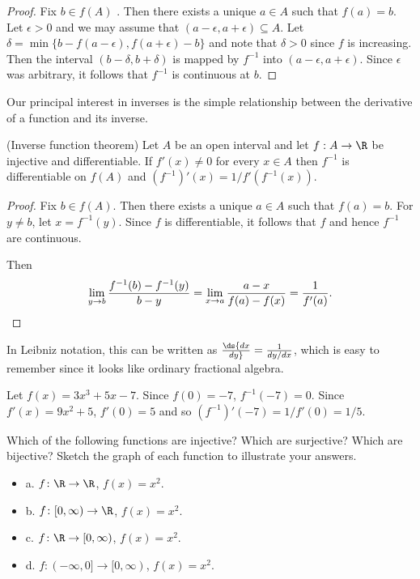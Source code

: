\begin{theorem}
\begin{theorem}
\begin{theorem}
\begin{theorem}
\begin{proof}
Fix $b\in f(A)$ . Then there exists a unique $a\in A$ such that
$f(a) = b $. Let $\epsilon > 0 $ and we may assume that $(a-\epsilon
, a+\epsilon ) \subseteq A $. Let $\delta =\min \{ b-
f(a-\epsilon ) , f(a+\epsilon ) -b \}$ and note that
$\delta
>0 $ since $f$ is increasing.  Then the interval $(b-\delta ,
b+\delta ) $ is mapped by $f^{-1} $ into $(a-\epsilon , a+\epsilon )
$. Since $\epsilon $ was arbitrary, it follows that $f^{-1 }$ is
continuous at $b$.
\end{proof}

Our principal interest in inverses is the simple relationship between
the derivative of a function and its inverse.

\begin{theorem} (Inverse function theorem) Let $A$ be an open interval and let $f:A\to
\label{thm:inverse function theorem}
\R$ be injective and differentiable.   If $f'(x) \neq 0 $
for every $x\in A $ then $f^{-1}$ is differentiable on $f(A)$ and
$(f^{-1})'(x) = 1/f'(f^{-1}(x))$.

\begin{proof} Fix $b\in f(A)$. Then there exists a unique $a\in A$ such
that $f(a)=b$. For $y\neq b $, let $x=f^{-1} (y) $. Since $f$ is
differentiable, it follows that $f$ and hence $f^{-1}$ are
continuous.

Then
$$\lim_{y\to b}{f^{-1} (b) - f^{-1} (y)\over b-y}
   = \lim_{x\to a}{a-x\over f(a) -f(x)} ={1\over f'(a)}.$$
\end{proof}

In Leibniz notation, this can be written as
$\ds{dx\over dy} ={1\over dy/dx}$, which is easy to remember since it looks
like ordinary fractional algebra.

\begin{example} Let $f(x) = 3x^3 + 5x - 7$. Since $f(0)=-7$, 
$f^{-1} (-7) =0$. Since $f'(x) = 9x^2 + 5$, $f'(0)=5$ and
so $(f^{-1})' (-7)=1/f'(0)=1/5$.
\end{example}

\begin{exercises}

\begin{exercise} Which of the following functions are injective? Which
are surjective? Which are bijective? Sketch the graph of each
function to illustrate your answers.

\begin{itemize} %

\item{a.} $f\colon \R\to\R$, $f(x)=x^2$.
\item{b.} $f\colon [0, \infty )\to\R$, $f(x)=x^2$.
\item{c.} $f\colon \R\to[0, \infty )$, $f(x)=x^2$.
\item{d.} $f\colon (-\infty,0]\to[0, \infty )$, $f(x)=x^2$.


\end{itemize}
\end{exercise}
\end{exercises}
\end{theorem}
\end{theorem}
\end{theorem}
\end{theorem}
\end{theorem}
